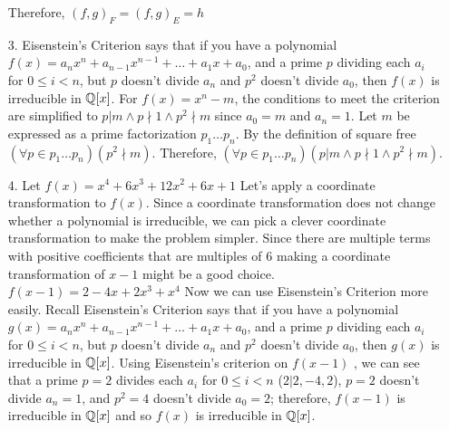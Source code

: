 \documentclass{article}
\begin{document}
\begin{enumerate}
    Therefore, \((f,g)_F = (f,g)_E = h\) 



    

    \item[3.] Eisenstein's Criterion says that if you have a polynomial $f(x) = a_{n}x^{n} + a_{n-1}x^{n-1} + \hdots + a_{1}x + a_{0}$, and a prime $p$ dividing each $a_{i}$ for $0 \leq i < n$, but $p$ doesn't divide $a_{n}$ and $p^{2}$ doesn't divide $a_{0}$, then $f(x)$ is irreducible in $\mathbb{Q}[x]$. For \(f(x) = x^n - m\), the conditions to meet the criterion are simplified to \(p | m \wedge p \nmid 1 \wedge p^2 \nmid m\) since \(a_0 = m\) and \(a_n = 1\). Let \(m\) be expressed as a prime factorization \(p_1\ldots p_n\). By the definition of square free \((\forall p \in {p_1\ldots p_n})(p^2 \nmid m)\). Therefore, \((\forall p \in {p_1\ldots p_n})(p | m \wedge p \nmid 1 \wedge p^2 \nmid m)\).

    \item[4.] Let \(f(x) = x^4 + 6x^3 + 12x^2 + 6x + 1\) Let's apply a coordinate transformation to \(f(x)\). Since a coordinate transformation does not change whether a polynomial is irreducible, we can pick a clever coordinate transformation to make the problem simpler. Since there are multiple terms with positive coefficients that are multiples of \(6\) making a coordinate transformation of \(x-1\) might be a good choice. \(f(x -1) = 2 - 4x + 2x^3 + x^4\) Now we can use Eisenstein's Criterion more easily. Recall Eisenstein's Criterion says that if you have a polynomial $g(x) = a_{n}x^{n} + a_{n-1}x^{n-1} + \hdots + a_{1}x + a_{0}$, and a prime $p$ dividing each $a_{i}$ for $0 \leq i < n$, but $p$ doesn't divide $a_{n}$ and $p^{2}$ doesn't divide $a_{0}$, then $g(x)$ is irreducible in $\mathbb{Q}[x]$. Using Eisenstein's criterion on \(f(x - 1)\) , we can see that a prime \(p = 2\) divides each $a_{i}$ for $0 \leq i < n$ (\(2 | 2,-4, 2\)), $p = 2$ doesn't divide $a_{n} = 1$, and $p^{2} = 4$ doesn't divide $a_{0} = 2$; therefore, $f(x - 1)$ is irreducible in $\mathbb{Q}[x]$ and so $f(x)$ is irreducible in $\mathbb{Q}[x]$. 
\end{enumerate}
\end{document}
